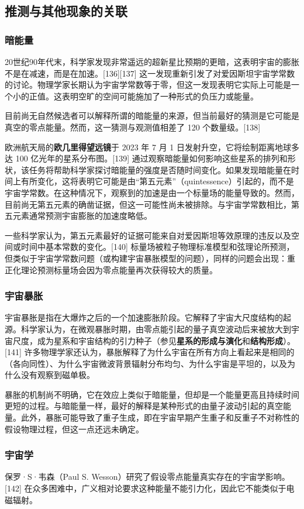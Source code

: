\subsection{推测与其他现象的关联} 
\subsubsection{暗能量}
20世纪90年代末，科学家发现非常遥远的超新星比预期的更暗，这表明宇宙的膨胀不是在减速，而是在加速。[136][137] 这一发现重新引发了对爱因斯坦宇宙学常数的讨论。物理学家长期认为宇宙学常数等于零，但这一发现表明它实际上可能是一个小的正值。这表明空旷的空间可能施加了一种形式的负压力或能量。

目前尚无自然候选者可以解释所谓的暗能量的来源，但当前最好的猜测是它可能是真空的零点能量。然而，这一猜测与观测值相差了 120 个数量级。[138]  

欧洲航天局的\textbf{欧几里得望远镜}于 2023 年 7 月 1 日发射升空，它将绘制距离地球多达 100 亿光年的星系分布图。[139] 通过观察暗能量如何影响这些星系的排列和形状，该任务将帮助科学家探讨暗能量的强度是否随时间变化。如果发现暗能量在时间上有所变化，这将表明它可能是由“第五元素”（quintessence）引起的，而不是宇宙学常数。在这种情况下，观察到的加速是由一个标量场的能量导致的。然而，目前尚无第五元素的确凿证据，但这一可能性尚未被排除。与宇宙学常数相比，第五元素通常预测宇宙膨胀的加速度略低。

一些科学家认为，第五元素最好的证据可能来自对爱因斯坦等效原理的违反以及空间或时间中基本常数的变化。[140] 标量场被粒子物理标准模型和弦理论所预测，但类似于宇宙学常数问题（或构建宇宙暴胀模型的问题），同样的问题会出现：重正化理论预测标量场会因为零点能量再次获得较大的质量。
\subsubsection{宇宙暴胀}  
宇宙暴胀是指在大爆炸之后的一个加速膨胀阶段。它解释了宇宙大尺度结构的起源。科学家认为，在微观暴胀时期，由零点能引起的量子真空波动后来被放大到宇宙尺度，成为星系和宇宙结构的引力种子（参见\textbf{星系的形成与演化}和\textbf{结构形成}）。[141] 许多物理学家还认为，暴胀解释了为什么宇宙在所有方向上看起来是相同的（各向同性）、为什么宇宙微波背景辐射分布均匀、为什么宇宙是平坦的，以及为什么没有观察到磁单极。

暴胀的机制尚不明确，它在效应上类似于暗能量，但却是一个能量更高且持续时间更短的过程。与暗能量一样，最好的解释是某种形式的由量子波动引起的真空能量。此外，暴胀可能导致了重子生成，即在宇宙早期产生重子和反重子不对称性的假设物理过程，但这一点还远未确定。
\subsubsection{宇宙学}
保罗·S·韦森（Paul S. Wesson）研究了假设零点能量真实存在的宇宙学影响。[142] 在众多困难中，广义相对论要求这种能量不能引力化，因此它不能类似于电磁辐射。